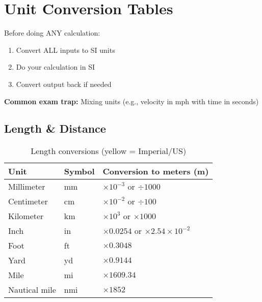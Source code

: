 
\section{Unit Conversion Tables}

\begin{tcolorbox}[colback=red!10!white,colframe=red!75!black,title= EXAM TIP: Always Convert to SI First!]
Before doing ANY calculation:
\begin{enumerate}
    \item Convert ALL inputs to SI units
    \item Do your calculation in SI
    \item Convert output back if needed
\end{enumerate}

\textbf{Common exam trap:} Mixing units (e.g., velocity in mph with time in seconds)
\end{tcolorbox}

\subsection{Length \& Distance}

\begin{table}[H]
\centering
\begin{tabular}{|l|l|l|}
\hline
\rowcolor{blue!20}
\textbf{Unit} & \textbf{Symbol} & \textbf{Conversion to meters (m)} \\
\hline
Millimeter & mm & $\times 10^{-3}$ or $\div 1000$ \\
\hline
Centimeter & cm & $\times 10^{-2}$ or $\div 100$ \\
\hline
Kilometer & km & $\times 10^{3}$ or $\times 1000$ \\
\hline
\rowcolor{yellow!20}
Inch & in & $\times 0.0254$ or $\times 2.54 \times 10^{-2}$ \\
\hline
\rowcolor{yellow!20}
Foot & ft & $\times 0.3048$ \\
\hline
\rowcolor{yellow!20}
Yard & yd & $\times 0.9144$ \\
\hline
\rowcolor{yellow!20}
Mile & mi & $\times 1609.34$ \\
\hline
\rowcolor{yellow!20}
Nautical mile & nmi & $\times 1852$ \\
\hline
\end{tabular}
\caption{Length conversions (yellow = Imperial/US)}
\end{table}

